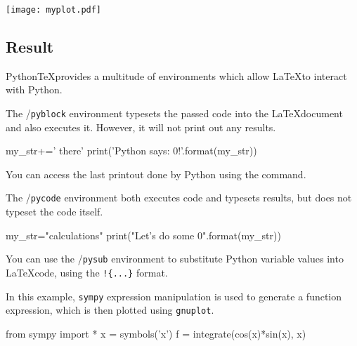 \documentclass{article}
\begin{document}
\begin{latex}
\begin{center}
	\texttt{[image: myplot.pdf]}
\end{center}
\end{latex}

\subsection*{Result}

Python\TeX provides a multitude of environments which allow \LaTeX to interact with Python.

The \texttt{\pyb}/\texttt{pyblock} environment typesets the passed code into the \LaTeX document and also executes it. However, it will not print out any results.


\begin{pyblock}
	my_str+=' there'
	print('Python says: {0}!'.format(my_str))
\end{pyblock}

You can access the last printout done by Python using the \texttt{\printpythontex} command.

\printpythontex

The \texttt{\pyc}/\texttt{pycode} environment both executes code and typesets results, but does not typeset the code itself.


\begin{pycode}
	my_str="calculations"
	print("Let's do some {0}".format(my_str))
\end{pycode}

You can use the \texttt{\pys}/\texttt{pysub} environment to substitute Python variable values into \LaTeX code, using the \verb|!{...}| format.

In this example, \verb|sympy| expression manipulation is used to generate a function expression, which is then plotted using \verb|gnuplot|.

\begin{pycode}
	from sympy import *
	x = symbols('x')
	f = integrate(cos(x)*sin(x), x)
\end{pycode}

\begin{pysub}
\end{pysub}
\end{document}
